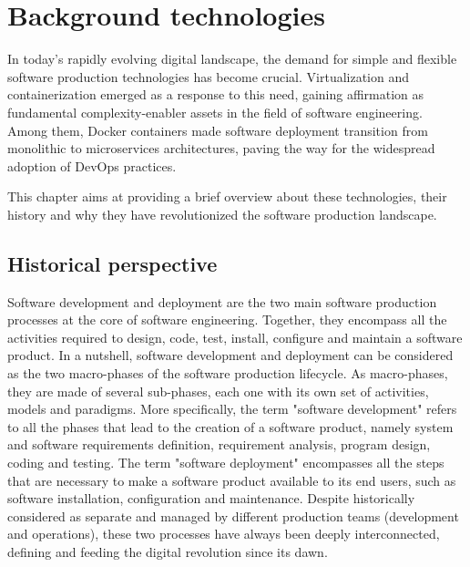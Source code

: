 \chapter{Background technologies}
In today's rapidly evolving digital landscape, the demand for simple and flexible software production technologies has become crucial. 
Virtualization and containerization emerged as a response to this need, gaining affirmation as fundamental complexity-enabler assets in the field of software engineering.
Among them, Docker containers made software deployment transition from monolithic to microservices architectures, paving the way for the widespread adoption of DevOps practices. 

This chapter aims at providing a brief overview about these technologies, their history and why they have revolutionized the software production landscape.
\newpage

\section{Historical perspective}
Software development and deployment are the two main software production processes at the core of software engineering. Together, they encompass all the activities required to design, code, test, install, configure and maintain a software product. In a nutshell, software development and deployment can be considered as the two macro-phases of the software production lifecycle. As macro-phases, they are made of several sub-phases, each one with its own set of activities, models and paradigms.
More specifically, the term "software development" refers to all the phases that lead to the creation of a software product, namely system and software requirements definition, requirement analysis, program design, coding and testing. The term "software deployment" encompasses all the steps that are necessary to make a software product available to its end users, such as software installation, configuration and maintenance. 
Despite historically considered as separate and managed by different production teams (development and operations), these two processes have always been deeply interconnected, defining and feeding the digital revolution since its dawn.

